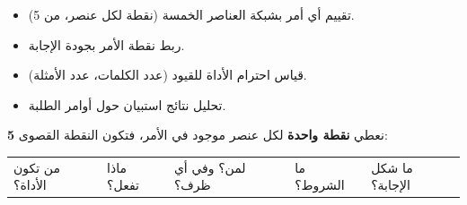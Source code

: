 \documentclass[a4paper]{article}
\begin{document}

\begin{itemize}
    \item تقييم أي أمر بشبكة العناصر الخمسة (نقطة لكل عنصر، من 5).
    \item ربط نقطة الأمر بجودة الإجابة.
    \item قياس احترام الأداة للقيود (عدد الكلمات، عدد الأمثلة).
    \item تحليل نتائج استبيان حول أوامر الطلبة.
\end{itemize}

\begin{tadhkir}
    نعطي \textbf{نقطة واحدة} لكل عنصر موجود في الأمر، فتكون النقطة القصوى \textbf{5}:
    \begin{center}
    \begin{tabular}{|C{2.4cm}|C{2.4cm}|C{2.4cm}|C{2.4cm}|C{2.4cm}|}
        \hline
         &  &  &  &  \\ \hline
        من تكون الأداة؟ & ماذا تفعل؟ & لمن؟ وفي أي ظرف؟ & ما الشروط؟ & ما شكل الإجابة؟ \\ \hline
    \end{tabular}
    \end{center}
\end{tadhkir}

\nisba

\end{document}
